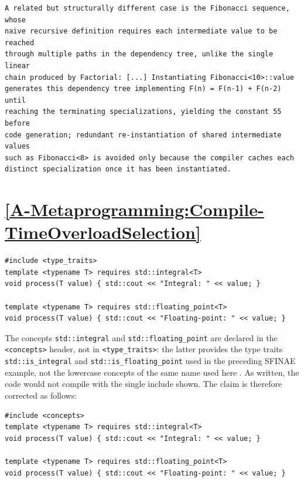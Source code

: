 \documentclass[11pt]{report}
\begin{document}
\begin{Verbatim}[breaklines=true]
A related but structurally different case is the Fibonacci sequence, whose
naive recursive definition requires each intermediate value to be reached
through multiple paths in the dependency tree, unlike the single linear
chain produced by Factorial: [...] Instantiating Fibonacci<10>::value
generates this dependency tree implementing F(n) = F(n-1) + F(n-2) until
reaching the terminating specializations, yielding the constant 55 before
code generation; redundant re-instantiation of shared intermediate values
such as Fibonacci<8> is avoided only because the compiler caches each
distinct specialization once it has been instantiated.
\end{Verbatim}

\section*{\hyperref[A-Metaprogramming:Compile-TimeOverloadSelection]{\ref*{A-Metaprogramming:Compile-TimeOverloadSelection} }}

\begin{Verbatim}[breaklines=true]
#include <type_traits>
template <typename T> requires std::integral<T>
void process(T value) { std::cout << "Integral: " << value; }

template <typename T> requires std::floating_point<T>
void process(T value) { std::cout << "Floating-point: " << value; }
\end{Verbatim}

The concepts \texttt{std::integral} and \texttt{std::floating\_point} are
declared in the \texttt{<concepts>} header, not in \texttt{<type\_traits>}:
the latter provides the type traits \texttt{std::is\_integral} and
\texttt{std::is\_floating\_point} used in the preceding SFINAE example, not
the lowercase concepts of the same name used here \cite{iso_cpp2024}. As
written, the code would not compile with the single include shown. The
claim is therefore corrected as follows:

\begin{Verbatim}[breaklines=true]
#include <concepts>
template <typename T> requires std::integral<T>
void process(T value) { std::cout << "Integral: " << value; }

template <typename T> requires std::floating_point<T>
void process(T value) { std::cout << "Floating-point: " << value; }
\end{Verbatim}
\end{document}
